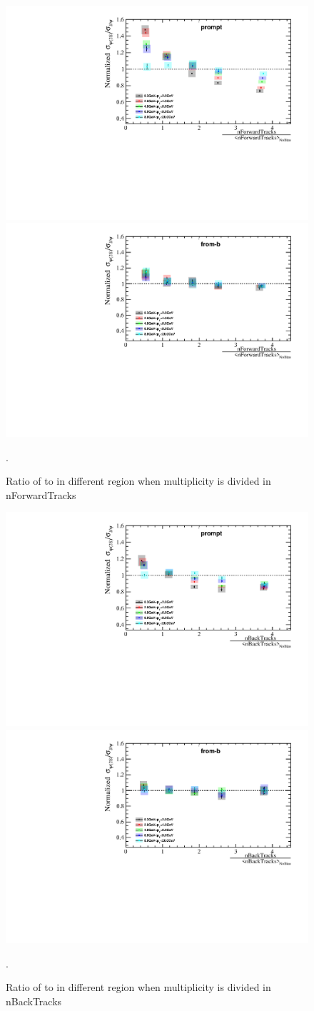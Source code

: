 \begin{figure}[H]
  \begin{center}
    \includegraphics[width=0.48\linewidth]{pdf/Result/promptRatioPTF.pdf}
    \includegraphics[width=0.48\linewidth]{pdf/Result/frombRatioPTF.pdf}
  \end{center}
  \caption{Ratio of \psitwos to \jpsi in different \pt region when multiplicity is divided in nForwardTracks}.
  \label{RatioPT_For}
\end{figure}
\begin{figure}[H]
  \begin{center}
    \includegraphics[width=0.48\linewidth]{pdf/Result/promptRatioPTB.pdf}
    \includegraphics[width=0.48\linewidth]{pdf/Result/frombRatioPTB.pdf}
  \end{center}
  \caption{Ratio of \psitwos to \jpsi in different \pt region when multiplicity is divided in nBackTracks}.
  \label{RatioPT_Back}
\end{figure}
